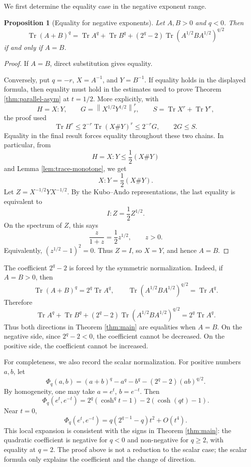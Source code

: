 \documentclass[11pt]{amsart}
\numberwithin{equation}{section}
\newtheorem{proposition}[theorem]{Proposition}
\newcommand{\Tr}{\operatorname{Tr}}
\newcommand{\norm}[1]{\left\lVert #1\right\rVert}
\begin{document}
We first determine the equality case in the negative exponent range.

\begin{proposition}[Equality for negative exponents]\label{prop:equality-negative}
Let \(A,B>0\) and \(q<0\).  Then
\[
    \Tr(A+B)^q
    =
    \Tr A^q+\Tr B^q+
    (2^q-2)\Tr(A^{1/2}BA^{1/2})^{q/2}
\]
if and only if \(A=B\).
\end{proposition}

\begin{proof}
If \(A=B\), direct substitution gives equality.

Conversely, put \(q=-r\), \(X=A^{-1}\), and \(Y=B^{-1}\).  If equality holds in the displayed formula, then equality must hold in the estimates used to prove Theorem \ref{thm:parallel-asym} at \(t=1/2\).  More explicitly, with
\[
    H=X:Y,\qquad
    G=\norm{X^{1/2}Y^{1/2}}_r^r,\qquad
    S=\Tr X^r+\Tr Y^r,
\]
the proof used
\[
    \Tr H^r\le 2^{-r}\Tr(X\#Y)^r\le 2^{-r}G,
    \qquad
    2G\le S.
\]
Equality in the final result forces equality throughout these two chains.  In particular, from
\[
    H=X:Y\le \frac12(X\#Y)
\]
and Lemma \ref{lem:trace-monotone}, we get
\[
    X:Y=\frac12(X\#Y).
\]
Let \(Z=X^{-1/2}YX^{-1/2}\).  By the Kubo--Ando representations, the last equality is equivalent to
\[
    I:Z=\frac12 Z^{1/2}.
\]
On the spectrum of \(Z\), this says
\[
    \frac{z}{1+z}=\frac12 z^{1/2},\qquad z>0.
\]
Equivalently, \((z^{1/2}-1)^2=0\).  Thus \(Z=I\), so \(X=Y\), and hence \(A=B\).
\end{proof}

The coefficient \(2^q-2\) is forced by the symmetric normalization.  Indeed, if \(A=B>0\), then
\[
    \Tr(A+B)^q=2^q\Tr A^q,
    \qquad
    \Tr(A^{1/2}BA^{1/2})^{q/2}=\Tr A^q.
\]
Therefore
\[
    \Tr A^q+\Tr B^q+
    (2^q-2)\Tr(A^{1/2}BA^{1/2})^{q/2}
    =
    2^q\Tr A^q.
\]
Thus both directions in Theorem \ref{thm:main} are equalities when \(A=B\).  On the negative side, since \(2^q-2<0\), the coefficient cannot be decreased.  On the positive side, the coefficient cannot be increased.

For completeness, we also record the scalar normalization.  For positive numbers \(a,b\), let
\[
    \Phi_q(a,b)
    =
    (a+b)^q-a^q-b^q-(2^q-2)(ab)^{q/2}.
\]
By homogeneity, one may take \(a=e^t\), \(b=e^{-t}\).  Then
\begin{equation}\label{eq:scalar-normalization}
    \Phi_q(e^t,e^{-t})
    =
    2^q(\cosh^q t-1)-2(\cosh(qt)-1).
\end{equation}
Near \(t=0\),
\begin{equation}\label{eq:scalar-expansion}
    \Phi_q(e^t,e^{-t})
    =
    q(2^{q-1}-q)t^2+O(t^4).
\end{equation}
This local expansion is consistent with the signs in Theorem \ref{thm:main}: the quadratic coefficient is negative for \(q<0\) and non-negative for \(q\ge 2\), with equality at \(q=2\).  The proof above is not a reduction to the scalar case; the scalar formula only explains the coefficient and the change of direction.
\end{document}
